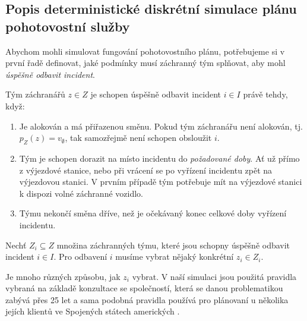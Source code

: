 \subsection{Popis deterministické diskrétní simulace plánu pohotovostní služby}\label{kap:definiceSimulace}

Abychom mohli simulovat fungování pohotovostního plánu,
potřebujeme si v první řadě definovat, jaké podmínky musí záchranný tým splňovat, aby mohl \textit{úspěšně odbavit incident}.

\begin{definice}\label{df:simulacePravidla1}
  Tým záchranářů $z \in Z$ je schopen úspěšně odbavit incident $i \in I$ právě tehdy, když:
  \begin{enumerate}
    \item
      Je alokován a má přiřazenou směnu. Pokud tým záchranářu není alokován, tj. $p_Z(z) = v_{\emptyset}$, tak samozřejmě není schopen obsloužit $i$.

    \item
      Tým je schopen dorazit na místo incidentu do \emph{požadované doby}.
      Ať už přímo z výjezdové stanice, nebo při vrácení se po vyřízení incidentu zpět na výjezdovou stanici. 
      V prvním případě tým potřebuje mít na výjezdové stanici k dispozi volné záchranné vozidlo.

    \item
      Týmu nekončí směna dříve, než je očekávaný konec celkové doby vyřízení incidentu.
  \end{enumerate}
\end{definice}

Nechť $Z_i \subseteq Z$ množina záchranných týmu, které jsou schopny úspěšně odbavit incident $i \in I$.
Pro odbavení $i$ musíme vybrat nějaký konkrétní $z_i \in Z_i$.

Je mnoho různých způsobu, jak $z_i$ vybrat.
V naší simulaci jsou použitá pravidla vybraná na základě konzultace se společností, která se danou problematikou zabývá přes 25 let
a sama podobná pravidla používá pro plánovaní u několika jejích klientů ve Spojených státech amerických \cite{logisSolutions}.

